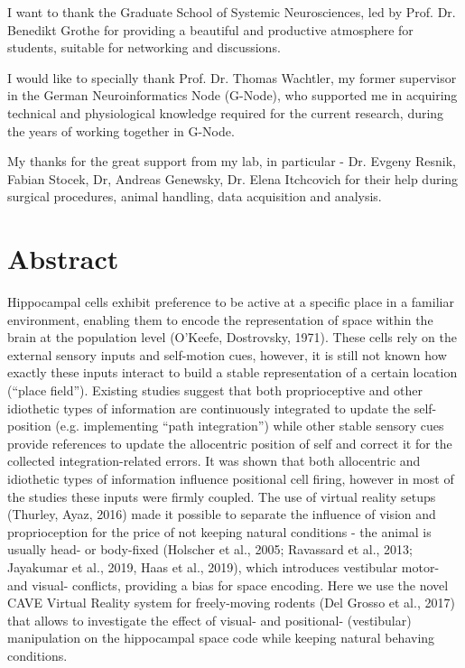 \documentclass[twoside, 12pt,  footinclude=true,  headinclude=true,  cleardoublepage=empty]{scrbook}
\begin{document}
I want to thank the Graduate School of Systemic Neurosciences, led by Prof. Dr. Benedikt Grothe for providing a beautiful and productive atmosphere for students, suitable for networking and discussions.

I would like to specially thank Prof. Dr. Thomas Wachtler, my former supervisor in the German Neuroinformatics Node (G-Node), who supported me in acquiring technical and physiological knowledge required for the current research, during the years of working together in G-Node.

My thanks for the great support from my lab, in particular - Dr. Evgeny Resnik, Fabian Stocek, Dr, Andreas Genewsky, Dr. Elena Itchcovich for their help during surgical procedures, animal handling, data acquisition and analysis.

\endgroup

\tableofcontents

\listoffigures
\listoftables

\chapter*{Abstract}
Hippocampal cells exhibit preference to be active at a specific place in a familiar environment, enabling them to encode the representation of space within the brain at the population level \cite{Fayyad1996} (O’Keefe, Dostrovsky, 1971). These cells rely on the external sensory inputs and self-motion cues, however, it is still not known how exactly these inputs interact to build a stable representation of a certain location (“place field”). Existing studies suggest that both proprioceptive and other idiothetic types of information are continuously integrated to update the self-position (e.g. implementing “path integration”) while other stable sensory cues provide references to update the allocentric position of self and correct it for the collected integration-related errors. It was shown that both allocentric and idiothetic types of information influence positional cell firing, however in most of the studies these inputs were firmly coupled. The use of virtual reality setups (Thurley, Ayaz, 2016) made it possible to separate the influence of vision and proprioception for the price of not keeping natural conditions - the animal is usually head- or body-fixed (Holscher et al., 2005; Ravassard et al., 2013; Jayakumar et al., 2019, Haas et al., 2019), which introduces vestibular motor- and visual- conflicts, providing a bias for space encoding. Here we use the novel CAVE Virtual Reality system for freely-moving rodents (Del Grosso et al., 2017) that allows to investigate the effect of visual- and positional- (vestibular) manipulation on the hippocampal space code while keeping natural behaving conditions.
\end{document}
